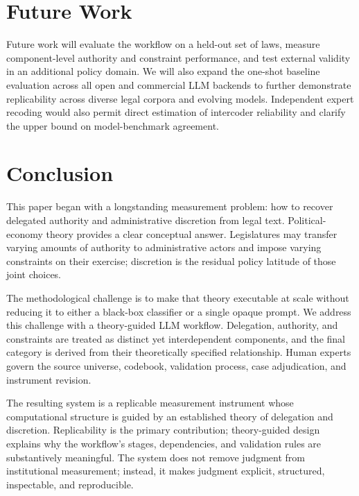 \documentclass[runningheads]{llncs}
\begin{document}
\section{Future Work}

Future work will evaluate the workflow on a held-out set of laws, measure component-level authority and constraint performance, and test external validity in an additional policy domain. We will also expand the one-shot baseline evaluation across all open and commercial LLM backends to further demonstrate replicability across diverse legal corpora and evolving models. Independent expert recoding would also permit direct estimation of intercoder reliability and clarify the upper bound on model-benchmark agreement.


\section{Conclusion}

This paper began with a longstanding measurement problem: how to recover delegated authority and administrative discretion from legal text. Political-economy theory provides a clear conceptual answer. Legislatures may transfer varying amounts of authority to administrative actors and impose varying constraints on their exercise; discretion is the residual policy latitude of those joint choices.

The methodological challenge is to make that theory executable at scale without reducing it to either a black-box classifier or a single opaque prompt. We address this challenge with a theory-guided LLM workflow. Delegation, authority, and constraints are treated as distinct yet interdependent components, and the final category is derived from their theoretically specified relationship. Human experts govern the source universe, codebook, validation process, case adjudication, and instrument revision.

The resulting system is a replicable measurement instrument whose computational structure is guided by an established theory of delegation and discretion. Replicability is the primary contribution; theory-guided design explains why the workflow's stages, dependencies, and validation rules are substantively meaningful. The system does not remove judgment from institutional measurement; instead, it makes judgment explicit, structured, inspectable, and reproducible.



\end{document}

